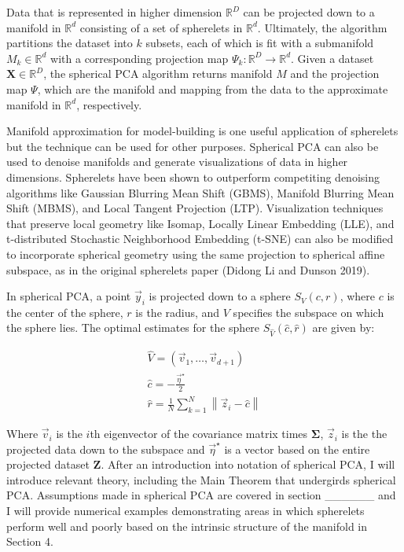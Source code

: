 \documentclass[]{article}
\begin{document}
Data that is represented in higher dimension \(\mathbb{R}^D\) can be
projected down to a manifold in \(\mathbb{R}^d\) consisting of a set of
spherelets in \(\mathbb{R}^d\). Ultimately, the algorithm partitions the
dataset into \(k\) subsets, each of which is fit with a submanifold
\(M_k \in \mathbb{R}^d\) with a corresponding projection map
\(\Psi_k: \mathbb{R}^D \rightarrow \mathbb{R}^d\). Given a dataset
\(\mathbf{X} \in \mathbb{R}^D\), the spherical PCA algorithm returns
manifold \(M\) and the projection map \(\Psi\), which are the manifold
and mapping from the data to the approximate manifold in
\(\mathbb{R}^d\), respectively.

Manifold approximation for model-building is one useful application of
spherelets but the technique can be used for other purposes. Spherical
PCA can also be used to denoise manifolds and generate visualizations of
data in higher dimensions. Spherelets have been shown to outperform
competiting denoising algorithms like Gaussian Blurring Mean Shift
(GBMS), Manifold Blurring Mean Shift (MBMS), and Local Tangent
Projection (LTP). Visualization techniques that preserve local geometry
like Isomap, Locally Linear Embedding (LLE), and t-distributed
Stochastic Neighborhood Embedding (t-SNE) can also be modified to
incorporate spherical geometry using the same projection to spherical
affine subspace, as in the original spherelets paper (Didong Li and
Dunson 2019).

In spherical PCA, a point \(\vec{y}_i\) is projected down to a sphere
\(S_V(c, r)\), where \(c\) is the center of the sphere, \(r\) is the
radius, and \(V\) specifies the subspace on which the sphere lies. The
optimal estimates for the sphere \(S_{\hat{V}}(\hat{c}, \hat{r})\) are
given by:

\[
\begin{gathered}
\hat{V} = (\vec{v}_1, \dots, \vec{v}_{d + 1}) \\
\hat{c} = -\frac{\vec{\eta}^\star}{2}  \\
\hat{r} = \frac{1}{N} \sum_{k = 1}^N \left\|\vec{z}_i - \hat{c} \right\|
\end{gathered}
\]

Where \(\vec{v}_i\) is the \(i\)th eigenvector of the covariance matrix
times \(\mathbf{\Sigma}\), \(\vec{z}_i\) is the the projected data down
to the subspace and \(\vec{\eta}^\star\) is a vector based on the entire
projected dataset \(\mathbf{Z}\). After an introduction into notation of
spherical PCA, I will introduce relevant theory, including the Main
Theorem that undergirds spherical PCA. Assumptions made in spherical PCA
are covered in section \_\_\_\_\_\_ and I will provide numerical
examples demonstrating areas in which spherelets perform well and poorly
based on the intrinsic structure of the manifold in Section 4.
\end{document}

